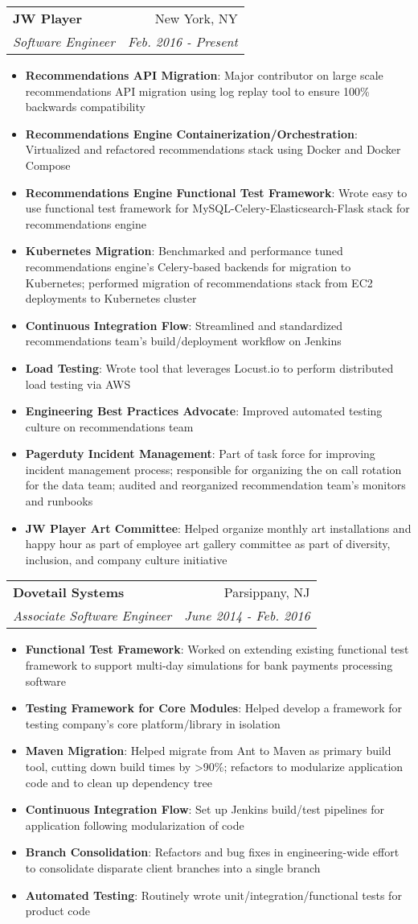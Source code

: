 \documentclass[letterpaper,11pt]{article}
\makeatletter
\newcommand{\resumeItem}[2]{
  \item\small{
    \textbf{#1}{: #2 \vspace{-2pt}}
  }
}
\newcommand{\resumeSubheading}[4]{
  \vspace{-1pt}\item
    \begin{tabular*}{0.97\textwidth}{l@{\extracolsep{\fill}}r}
      \textbf{#1} & #2 \\
      \textit{\small#3} & \textit{\small #4} \\
    \end{tabular*}\vspace{-5pt}
}
\newcommand{\resumeItemListStart}{\begin{itemize}}
\newcommand{\resumeItemListEnd}{\end{itemize}\vspace{-5pt}}
\makeatother
\begin{document}
    \resumeSubheading
      {JW Player}{New York, NY}
      {Software Engineer}{Feb. 2016 - Present}
      \resumeItemListStart
        \resumeItem{Recommendations API Migration}
          {Major contributor on large scale recommendations API migration using log replay tool to ensure 100\% backwards compatibility}
        \resumeItem{Recommendations Engine Containerization/Orchestration}
          {Virtualized and refactored recommendations stack using Docker and Docker Compose}
        \resumeItem{Recommendations Engine Functional Test Framework}
          {Wrote easy to use functional test framework for MySQL-Celery-Elasticsearch-Flask stack for recommendations engine}
        \resumeItem{Kubernetes Migration}
          {Benchmarked and performance tuned recommendations engine's Celery-based backends for migration to Kubernetes; performed migration of recommendations stack from EC2 deployments to Kubernetes cluster}
        \resumeItem{Continuous Integration Flow}
          {Streamlined and standardized recommendations team's build/deployment workflow on Jenkins}
        \resumeItem{Load Testing}
          {Wrote tool that leverages Locust.io to perform distributed load testing via AWS}
        \resumeItem{Engineering Best Practices Advocate}
          {Improved automated testing culture on recommendations team}
        \resumeItem{Pagerduty Incident Management}
          {Part of task force for improving incident management process; responsible for organizing the on call rotation for the data team; audited and reorganized recommendation team's monitors and runbooks}
        \resumeItem{JW Player Art Committee}
          {Helped organize monthly art installations and happy hour as part of employee art gallery committee as part of diversity, inclusion, and company culture initiative}
      \resumeItemListEnd

    \resumeSubheading
      {Dovetail Systems}{Parsippany, NJ}
      {Associate Software Engineer}{June 2014 - Feb. 2016}
      \resumeItemListStart
        \resumeItem{Functional Test Framework}
          {Worked on extending existing functional test framework to support multi-day simulations for bank payments processing software}
        \resumeItem{Testing Framework for Core Modules}
          {Helped develop a framework for testing company's core platform/library in isolation}
        \resumeItem{Maven Migration}
          {Helped migrate from Ant to Maven as primary build tool, cutting down build times by >90\%; refactors to modularize application code and to clean up dependency tree}
        \resumeItem{Continuous Integration Flow}
          {Set up Jenkins build/test pipelines for application following modularization of code}
        \resumeItem{Branch Consolidation}
          {Refactors and bug fixes in engineering-wide effort to consolidate disparate client branches into a single branch}
        \resumeItem{Automated Testing}
          {Routinely wrote unit/integration/functional tests for product code}
      \resumeItemListEnd
\end{document}
